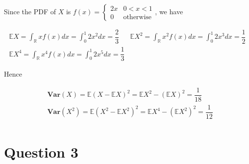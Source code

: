 \documentclass[12pt]{article}
\begin{document}
Since the PDF of $X$ is $f(x)=\left\{\begin{array}{ll}
        2x & 0<x<1 \\ 0&\text{otherwise}\end{array}\right.$, we have

$$
    \begin{array}{ll}
        \displaystyle\mathbb{E}X=\int_\mathbb{R} xf(x)dx=\int_0^1 2x^2dx=\dfrac{2}{3}     &
        \displaystyle\mathbb{E}X^2=\int_\mathbb{R} x^2f(x)dx=\int_0^1 2x^3dx=\dfrac{1}{2}   \\
        \displaystyle\mathbb{E}X^4=\int_\mathbb{R} x^4f(x)dx=\int_0^1 2x^5dx=\dfrac{1}{3} &
    \end{array}
$$

Hence

\begin{align*}
     & \mathbf{Var}(X)=\mathbb{E}(X-\mathbb{E}X)^2=\mathbb{E}X^2-(\mathbb{E}X)^2=\dfrac{1}{18}         \\
     & \mathbf{Var}(X^2)=\mathbb{E}(X^2-\mathbb{E}X^2)^2=\mathbb{E}X^4-(\mathbb{E}X^2)^2=\dfrac{1}{12} \\
\end{align*}

\section{Question 3}
\end{document}
